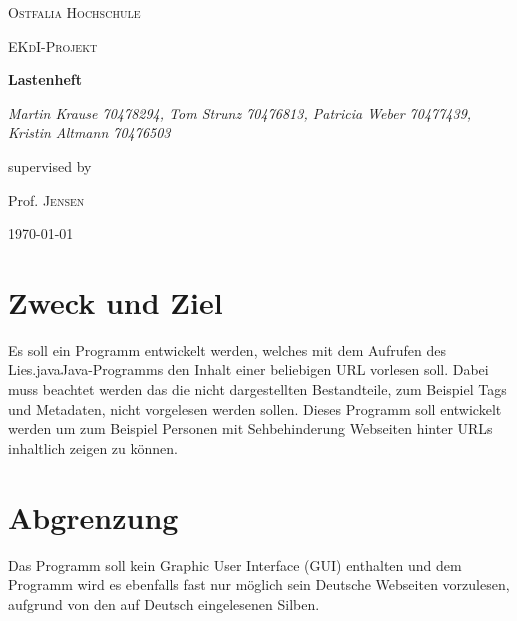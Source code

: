 \documentclass[12pt]{scrartcl}
\begin{document}
\begin{titlepage}
	\centering
	{\scshape\LARGE Ostfalia Hochschule \par}
	\vspace{1cm}
	{\scshape\Large EKdI-Projekt\par}
	\vspace{1.5cm}
	{\huge\bfseries Lastenheft\par}
	\vspace{2cm}
	{\Large\itshape Martin Krause 70478294, Tom Strunz 70476813, Patricia Weber 70477439, Kristin Altmann 70476503\par}
	\vfill
	supervised by\par
	Prof. \textsc{Jensen}

	\vfill

	{\large \today\par}
\end{titlepage}


\tableofcontents
\newpage


\section{Zweck und Ziel}
Es soll ein Programm entwickelt werden, welches mit dem Aufrufen des \glqq Lies.java\grqq Java-Programms den Inhalt einer beliebigen URL vorlesen soll. Dabei muss beachtet werden das die nicht dargestellten Bestandteile, zum Beispiel Tags und Metadaten, nicht vorgelesen werden sollen. Dieses Programm soll entwickelt werden um zum Beispiel Personen mit Sehbehinderung Webseiten hinter URLs inhaltlich zeigen zu können.

\section{Abgrenzung}
Das Programm soll kein Graphic User Interface (GUI) enthalten und dem Programm wird es ebenfalls fast nur möglich sein Deutsche Webseiten vorzulesen, aufgrund von den auf Deutsch eingelesenen Silben.
\end{document}
